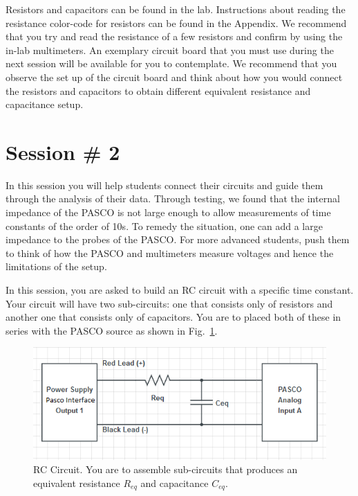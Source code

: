 \documentclass[12pt]{report}
\begin{document}
Resistors and capacitors can be found in the lab. Instructions about reading the resistance color-code for resistors can be found in the Appendix. We recommend that you try and read the resistance of a few resistors and confirm by using the in-lab multimeters. An exemplary circuit board that you must use during the next session will be available for you to contemplate. We recommend that you observe the set up of the circuit board and think about how you would connect the resistors and capacitors to obtain different equivalent resistance and capacitance setup.

\section{Session \# 2}
\begin{tcolorbox}[title=Session \#2]
In this session you will help students connect their circuits and guide them through the analysis of their data. Through testing, we found that the internal impedance of the PASCO is not large enough to allow measurements of time constants of the order of 10s. To remedy the situation, one can add a large impedance to the probes of the PASCO. For more advanced students, push them to think of how the PASCO and multimeters measure voltages and hence the limitations of the setup.
\end{tcolorbox}

In this session, you are asked to build an RC circuit with a specific time constant. Your circuit will have two sub-circuits: one that consists only of resistors and another one that consists only of capacitors. You are to placed both of these in series with the PASCO source as shown in Fig.~\ref{Fig:lab2-session2-circuit}.

\begin{figure}[h]
\centering
\includegraphics[width=0.9\linewidth]{lab2-session2-circuit}
\caption{RC Circuit. You are to assemble sub-circuits that produces an equivalent resistance $R_{eq}$ and capacitance $C_{eq}$.}
\label{Fig:lab2-session2-circuit}
\end{figure}
\end{document}
